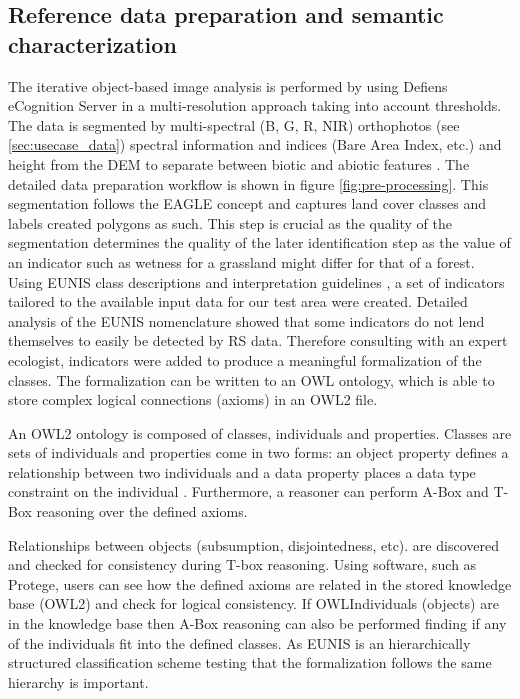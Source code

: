 \documentclass[authoryear, review,12pt,number]{elsarticle}
\begin{document}
\label{subsec:reference_data_and_semantic_characterisation} 
\subsection{Reference data preparation and semantic characterization}
The iterative object-based image analysis is performed by \cite{Tintrup2015} 
using Defiens eCognition Server in a multi-resolution approach 
\citep{baatz2001ecognition} taking into account thresholds. The data is 
segmented by multi-spectral (B, G, R, NIR) orthophotos (see 
\ref{sec:usecase_data}) spectral information and indices (Bare Area Index, 
etc.) and height from the DEM to separate between biotic and abiotic features 
\citep{Tintrup2015}. The detailed data preparation workflow is shown in figure 
\ref{fig:pre-processing}. This segmentation follows the EAGLE concept and
captures land cover classes and labels created polygons as such. This step is
crucial as the quality of the segmentation determines the quality of the later
identification step as the value of an indicator such as wetness for a grassland
might differ for that of a forest. Using EUNIS class descriptions and
interpretation guidelines \citep{EUNISManual}, a set of indicators tailored to
the available input data for our test area were created. Detailed analysis of
the EUNIS nomenclature showed that some indicators do not lend themselves to
easily be detected by RS data. Therefore consulting with an expert ecologist,
indicators were added to produce a meaningful formalization of the classes. The
formalization can be written to an OWL ontology, which is able to store complex
logical connections (axioms) in an OWL2 file.

An OWL2 ontology is composed of classes, individuals and properties. Classes are
sets of individuals and properties come in two forms: an object property defines
a relationship between two individuals and a data property  places a data type
constraint on the individual \citep{OWL2}. Furthermore, a reasoner can perform
A-Box and T-Box reasoning over the defined axioms. 

Relationships between objects (subsumption, disjointedness, etc). are discovered
and checked for consistency during T-box reasoning. Using software, such as
Protege, users can see how the defined axioms are related in the stored
knowledge base (OWL2) and check for logical consistency. If OWLIndividuals
(objects) are in the knowledge base then A-Box reasoning can also be performed
finding if any of the individuals fit into the defined classes. As EUNIS is an
hierarchically structured classification scheme testing that the formalization
follows the same hierarchy is important. 
\end{document}
